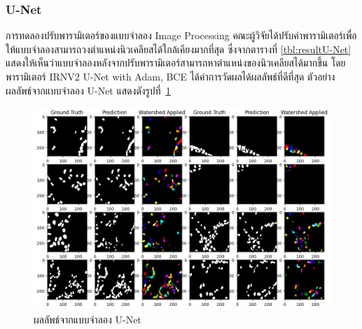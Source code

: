 \documentclass[12pt,oneside,openright,a4paper]{cpe-thai-project}
\begin{document}
\subsubsection{U-Net}
การทดลองปรับพารามิเตอร์ของแบบจำลอง Image Processing คณะผู้วิจัยได้ปรับค่าพารามิเตอร์เพื่อให้แบบจำลองสามารถวงตำแหน่งนิวเคลียสได้ใกล้เคียงมากที่สุด ซึ่งจากตารางที่ \ref{tbl:resultU-Net} แสดงให้เห็นว่าแบบจำลองหลังจากปรับพารามิเตอร์สามารถหาตำแหน่งของนิวเคลียสได้มากขึ้น โดย พารามิเตอร์ IRNV2 U-Net with Adam, BCE ได้ค่าการวัดผลได้ผลลัพธ์ที่ดีที่สุด ตัวอย่างผลลัพธ์จากแบบจำลอง U-Net แสดงดังรูปที่~\ref{fig:watershed_apply}
\begin{figure}[!h]
    \centering
    \includegraphics[scale=0.5]{images/watershed_apply.png}
    \caption{ผลลัพธ์จากแบบจำลอง U-Net}
    \label{fig:watershed_apply}
\end{figure}
\end{document}
